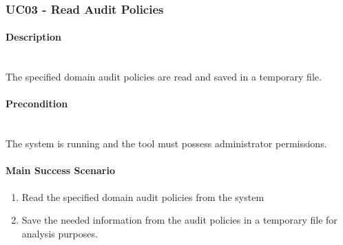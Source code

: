 \subsubsection{UC03 - Read Audit Policies}
\begin{tcolorbox}
    \paragraph{Description} \ \\
    The specified domain audit policies are read and saved in a temporary file.
    \ \\
    \paragraph{Precondition} \ \\
    The system is running and the tool must possess administrator permissions.
    \ \\
    \paragraph{Main Success Scenario} 
    \begin{enumerate}
        \item Read the specified domain audit policies from the system
        \item Save the needed information from the audit policies in a temporary file for analysis purposes.
    \end{enumerate}   
\end{tcolorbox}

